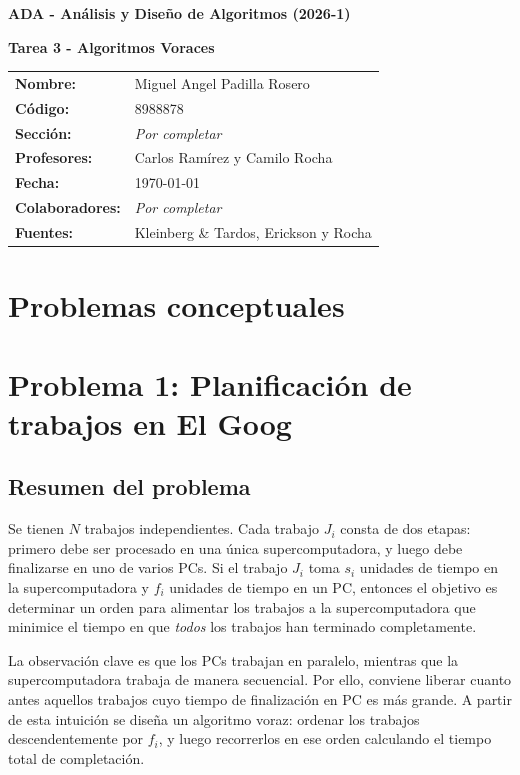 \documentclass[11pt]{article}
\newcommand{\curso}{ADA - Análisis y Diseño de Algoritmos (2026-1)}
\newcommand{\tarea}{Tarea 3 - Algoritmos Voraces}
\newcommand{\nombre}{Miguel Angel Padilla Rosero}
\newcommand{\codigo}{8988878}
\newcommand{\profesores}{Carlos Ramírez y Camilo Rocha}
\newcommand{\fecha}{\today}
\newcommand{\seccion}{\textit{Por completar}}
\newcommand{\colaboradores}{\textit{Por completar}}
\newcommand{\fuentes}{Kleinberg \& Tardos, Erickson y Rocha}
\begin{document}
\begin{titlepage}
    \centering
    {\Large \textbf{\curso}\par}
    \vspace{1cm}
    {\huge \textbf{\tarea}\par}
    \vspace{1.3cm}

    \begin{tabular}{>{\bfseries}l l}
        Nombre: & \nombre \\
        Código: & \codigo \\
        Sección: & \seccion \\
        Profesores: & \profesores \\
        Fecha: & \fecha \\
        Colaboradores: & \colaboradores \\
        Fuentes: & \fuentes \\
    \end{tabular}

    \vfill
\end{titlepage}

\section*{Problemas conceptuales}

\section{Problema 1: Planificación de trabajos en El Goog}

\subsection*{Resumen del problema}

Se tienen \(N\) trabajos independientes. Cada trabajo \(J_i\) consta de dos etapas:
primero debe ser procesado en una única supercomputadora, y luego debe finalizarse
en uno de varios PCs. Si el trabajo \(J_i\) toma \(s_i\) unidades de tiempo en la
supercomputadora y \(f_i\) unidades de tiempo en un PC, entonces el objetivo es
determinar un orden para alimentar los trabajos a la supercomputadora que minimice
el tiempo en que \emph{todos} los trabajos han terminado completamente.

La observación clave es que los PCs trabajan en paralelo, mientras que la
supercomputadora trabaja de manera secuencial. Por ello, conviene liberar cuanto antes
aquellos trabajos cuyo tiempo de finalización en PC es más grande. A partir de esta
intuición se diseña un algoritmo voraz: ordenar los trabajos descendentemente por
\(f_i\), y luego recorrerlos en ese orden calculando el tiempo total de completación.
\end{document}
